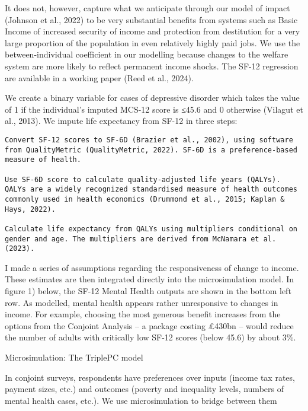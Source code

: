 \documentclass[
  letterpaper,
  DIV=11,
  numbers=noendperiod]{scrartcl}
\begin{document}
It does not, however, capture what we anticipate through our model of
impact (Johnson et al., 2022) to be very substantial benefits from
systems such as Basic Income of increased security of income and
protection from destitution for a very large proportion of the
population in even relatively highly paid jobs. We use the
between-individual coefficient in our modelling because changes to the
welfare system are more likely to reflect permanent income shocks. The
SF-12 regression are available in a working paper (Reed et al., 2024).

We create a binary variable for cases of depressive disorder which takes
the value of 1 if the individual's imputed MCS-12 score is ≤45.6 and 0
otherwise (Vilagut et al., 2013). We impute life expectancy from SF-12
in three steps:

\begin{verbatim}
Convert SF-12 scores to SF-6D (Brazier et al., 2002), using software from QualityMetric (QualityMetric, 2022). SF-6D is a preference-based measure of health. 

Use SF-6D score to calculate quality-adjusted life years (QALYs). QALYs are a widely recognized standardised measure of health outcomes commonly used in health economics (Drummond et al., 2015; Kaplan & Hays, 2022). 

Calculate life expectancy from QALYs using multipliers conditional on gender and age. The multipliers are derived from McNamara et al. (2023). 
\end{verbatim}

I made a series of assumptions regarding the responsiveness of change to
income. These estimates are then integrated directly into the
microsimulation model. In figure 1) below, the SF-12 Mental Health
outputs are shown in the bottom left row. As modelled, mental health
appears rather unresponsive to changes in income. For example, choosing
the most generous benefit increases from the options from the Conjoint
Analysis -- a package costing £430bn -- would reduce the number of
adults with critically low SF-12 scores (below 45.6) by about 3\%.

Microsimulation: The TriplePC model

In conjoint surveys, respondents have preferences over inputs (income
tax rates, payment sizes, etc.) and outcomes (poverty and inequality
levels, numbers of mental health cases, etc.). We use microsimulation to
bridge between them
\end{document}
